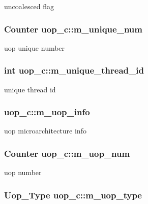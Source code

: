 \label{classuop__c_aa2aef7fac1040ff057b6e77867957072}
uncoalesced flag \hypertarget{classuop__c_a3b6fcba563db0edda36f52978c638c4d}{
\subsubsection[{m\_\-unique\_\-num}]{\setlength{\rightskip}{0pt plus 5cm}Counter {\bf uop\_\-c::m\_\-unique\_\-num}}}
\label{classuop__c_a3b6fcba563db0edda36f52978c638c4d}
uop unique number \hypertarget{classuop__c_a393be438169e3d639387930aaf97c0d9}{
\subsubsection[{m\_\-unique\_\-thread\_\-id}]{\setlength{\rightskip}{0pt plus 5cm}int {\bf uop\_\-c::m\_\-unique\_\-thread\_\-id}}}
\label{classuop__c_a393be438169e3d639387930aaf97c0d9}
unique thread id \hypertarget{classuop__c_a0c3d8af431bbce5095bb0c2c7bddfb99}{
\subsubsection[{m\_\-uop\_\-info}]{ {\bf uop\_\-c::m\_\-uop\_\-info}}}
\label{classuop__c_a0c3d8af431bbce5095bb0c2c7bddfb99}
uop microarchitecture info \hypertarget{classuop__c_ac38111e7296a5b8200866328c1826e71}{
\subsubsection[{m\_\-uop\_\-num}]{\setlength{\rightskip}{0pt plus 5cm}Counter {\bf uop\_\-c::m\_\-uop\_\-num}}}
\label{classuop__c_ac38111e7296a5b8200866328c1826e71}
uop number \hypertarget{classuop__c_aa8674c436855849f9f2d0c8ab0267e3b}{
\subsubsection[{m\_\-uop\_\-type}]{\setlength{\rightskip}{0pt plus 5cm}Uop\_\-Type {\bf uop\_\-c::m\_\-uop\_\-type}}}

